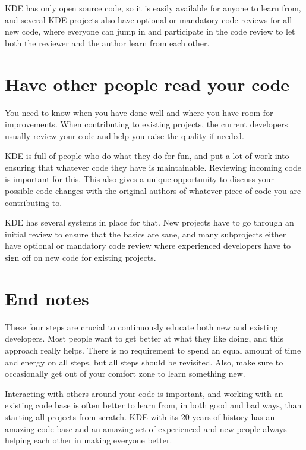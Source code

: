 KDE has only open source code, so it is easily available for anyone to learn from, and several KDE projects also have optional or mandatory code reviews for all new code, where everyone can jump in and participate in the code review to let both the reviewer and the author learn from each other.

\section*{Have other people read your code}
You need to know when you have done well and where you have room for improvements. When contributing to existing projects, the current developers usually review your code and help you raise the quality if needed.

KDE is full of people who do what they do for fun, and put a lot of work into ensuring that whatever code they have is maintainable. Reviewing incoming code is important for this. This also gives a unique opportunity to discuss your possible code changes with the original authors of whatever piece of code you are contributing to.

KDE has several systems in place for that. New projects have to go through an initial review to ensure that the basics are sane, and many subprojects either have optional or mandatory code review where experienced developers have to sign off on new code for existing projects.

\section*{End notes}
These four steps are crucial to continuously educate both new and existing developers. Most people want to get better at what they like doing, and this approach really helps. There is no requirement to spend an equal amount of time and energy on all steps, but all steps should be revisited. Also, make sure to occasionally get out of your comfort zone to learn something new.

Interacting with others around your code is important, and working with an existing code base is often better to learn from, in both good and bad ways, than starting all projects from scratch. KDE with its 20 years of history has an amazing code base and an amazing set of experienced and new people always helping each other in making everyone better.
